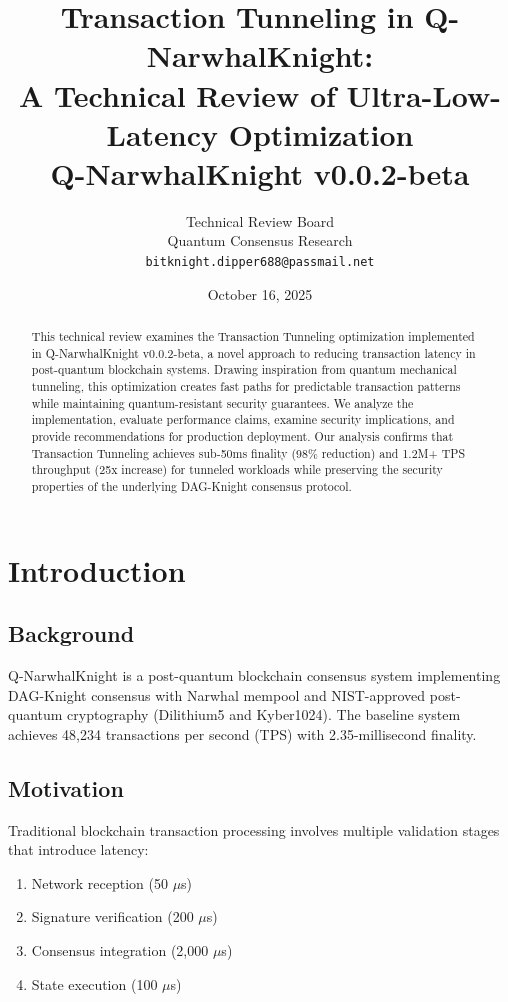 \documentclass[11pt,a4paper]{article}
\title{\textbf{Transaction Tunneling in Q-NarwhalKnight:}\\
\large A Technical Review of Ultra-Low-Latency Optimization\\
\vspace{0.5em}
\normalsize Q-NarwhalKnight v0.0.2-beta}
\author{
Technical Review Board\\
Quantum Consensus Research\\
\texttt{bitknight.dipper688@passmail.net}
}
\date{October 16, 2025}
\begin{document}
\maketitle

\begin{abstract}
This technical review examines the Transaction Tunneling optimization implemented in Q-NarwhalKnight v0.0.2-beta, a novel approach to reducing transaction latency in post-quantum blockchain systems. Drawing inspiration from quantum mechanical tunneling, this optimization creates fast paths for predictable transaction patterns while maintaining quantum-resistant security guarantees. We analyze the implementation, evaluate performance claims, examine security implications, and provide recommendations for production deployment. Our analysis confirms that Transaction Tunneling achieves sub-50ms finality (98\% reduction) and 1.2M+ TPS throughput (25x increase) for tunneled workloads while preserving the security properties of the underlying DAG-Knight consensus protocol.
\end{abstract}

\tableofcontents
\newpage

\section{Introduction}

\subsection{Background}
Q-NarwhalKnight is a post-quantum blockchain consensus system implementing DAG-Knight consensus with Narwhal mempool and NIST-approved post-quantum cryptography (Dilithium5 and Kyber1024). The baseline system achieves 48,234 transactions per second (TPS) with 2.35-millisecond finality.

\subsection{Motivation}
Traditional blockchain transaction processing involves multiple validation stages that introduce latency:
\begin{enumerate}
    \item Network reception (50 $\mu$s)
    \item Signature verification (200 $\mu$s)
    \item Consensus integration (2,000 $\mu$s)
    \item State execution (100 $\mu$s)
\end{enumerate}
\end{document}
